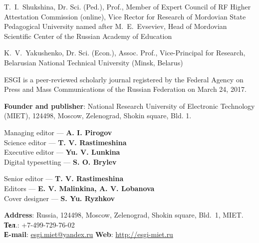 \begin{otherlanguage}{english}
\begin{multicols}{2}
\noindent T. I. Shukshina, Dr. Sci. (Ped.), Prof., Member of Expert Council of RF Higher Attestation Commission (online), Vice Rector for Research of Mordovian State Pedagogical University named after M. E. Evseviev, Head of Mordovian Scientific Center of the Russian Academy of Education

\noindent K. V. Yakushenko, Dr. Sci. (Econ.), Assoc. Prof., Vice-Principal for Research, Belarusian National Technical University (Minsk, Belarus)
    \end{multicols}

\begin{flushleft}
\footnotesize
ESGI is a peer-reviewed scholarly journal registered by the Federal Agency on Press and Mass Communications
of the Russian Federation on March 24, 2017.

\vspace{1em}
\textbf{Founder and publisher}: National Research University of Electronic Technology (MIET), 124498, Moscow,
Zelenograd, Shokin square, Bld. 1.
\end{flushleft}

\noindent
\begin{minipage}[t]{.48\textwidth}
    
\begin{flushleft}
  \footnotesize
        Managing editor — \textbf{A. I. Pirogov}\\
Science editor — \textbf{T. V. Rastimeshina} \\
Executive editor — \textbf{Yu. V. Lunkina }\\
Digital typesetting — \textbf{S. O. Brylev}
    \end{flushleft}
\end{minipage}\hspace{0.04\textwidth}
\begin{minipage}[t]{.48\textwidth}
    \begin{flushleft}
        \footnotesize
        Senior editor — \textbf{T. V. Rastimeshina}\\
        Editors — \textbf{E. V. Malinkina, A. V. Lobanova}\\
        Cover designer — \textbf{S. Yu. Ryzhkov}
    \end{flushleft}
\end{minipage}

\begin{flushleft}
    \footnotesize
    \textbf{Address}: Russia, 124498, Moscow, Zelenograd, Shokin square, Bld. 1, MIET.\\
    \textbf{Тел}.: +7-499-729-76-02\\
    \textbf{Е-mail}: \href{mailto:esgi.miet@yandex.ru}{esgi.miet@yandex.ru} \hspace{3em}
    \textbf{Web}: \url{http://esgi-miet.ru}


\end{flushleft}
\end{otherlanguage}
